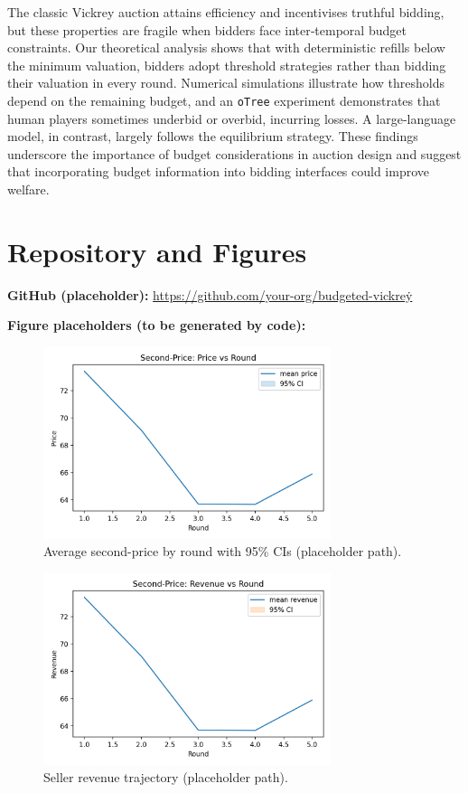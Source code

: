 The classic Vickrey auction attains efficiency and incentivises truthful bidding, but these properties are fragile when bidders face inter‑temporal budget constraints.  Our theoretical analysis shows that with deterministic refills below the minimum valuation, bidders adopt threshold strategies rather than bidding their valuation in every round.  Numerical simulations illustrate how thresholds depend on the remaining budget, and an \texttt{oTree} experiment demonstrates that human players sometimes underbid or overbid, incurring losses.  A large‑language model, in contrast, largely follows the equilibrium strategy.  These findings underscore the importance of budget considerations in auction design and suggest that incorporating budget information into bidding interfaces could improve welfare.


\section*{Repository and Figures}
\noindent\textbf{GitHub (placeholder):} \href{https://github.com/your-org/budgeted-vickrey}{https://github.com/your-org/budgeted-vickrey}\.\par\smallskip
\noindent\textbf{Figure placeholders (to be generated by code):}
\begin{figure}[H]
  \centering
  \includegraphics[width=0.75\textwidth]{figures/price_path.png}
  \caption{Average second-price by round with 95\% CIs (placeholder path).}
  \label{fig:price_path}
\end{figure}
\begin{figure}[H]
  \centering
  \includegraphics[width=0.75\textwidth]{figures/revenue_by_round.png}
  \caption{Seller revenue trajectory (placeholder path).}
  \label{fig:revenue_by_round}
\end{figure}

